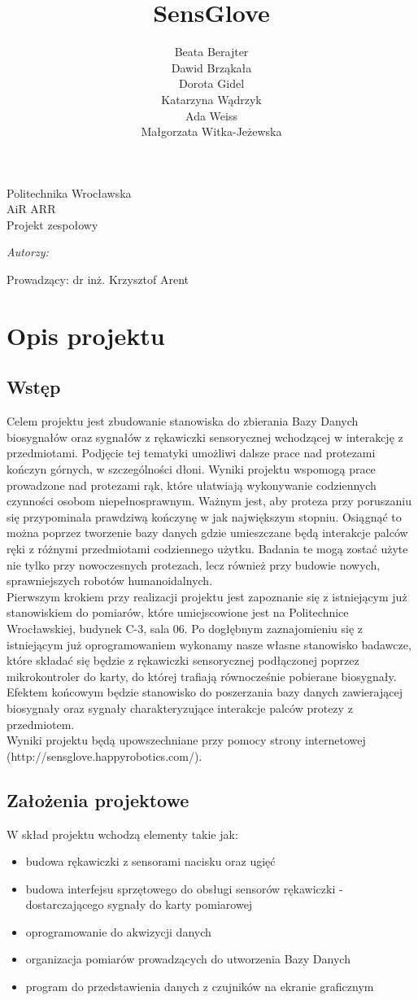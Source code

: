 \documentclass{article}
\author{Beata Berajter\\
Dawid Brząkała\\
Dorota Gidel\\
Katarzyna Wądrzyk\\
Ada Weiss\\
Małgorzata Witka-Jeżewska\\
 }%
\title{SensGlove}
\makeatletter
\renewcommand{\maketitle}{\begin{titlepage}
    \vspace*{1cm}
    \begin{center}
    Politechnika Wrocławska\\
    AiR ARR\\
 Projekt zespołowy
    \end{center}
      \vspace{3cm}
    \begin{center}

     \LARGE \textsc {\@title}
         \end{center}
     \vspace{1cm}

    \begin{center}
    \textit{ Autorzy:}\\
   \textit{\@author}
     \end{center}
      \vspace{1cm}

     \begin{center}

    Prowadzący:
  dr inż. Krzysztof Arent %
    \end{center}

    \vspace*{\stretch{6}}
    \begin{center}
    \@date
    \end{center}
  \end{titlepage}
}
\makeatother
\begin{document}
\maketitle
\newpage
\tableofcontents
\newpage
\section{Opis projektu}
\subsection{Wstęp}
Celem projektu jest zbudowanie stanowiska do zbierania Bazy Danych biosygnałów oraz sygnałów z rękawiczki sensorycznej wchodzącej w interakcję z przedmiotami. Podjęcie tej tematyki umożliwi dalsze prace nad protezami kończyn górnych, w szczególności dłoni. Wyniki projektu wspomogą prace prowadzone nad protezami rąk, które ułatwiają wykonywanie codziennych czynności osobom niepełnosprawnym. Ważnym jest, aby proteza przy poruszaniu się przypominała prawdziwą kończynę w jak największym stopniu. Osiągnąć to można poprzez tworzenie bazy danych gdzie umieszczane będą interakcje palców ręki z różnymi przedmiotami codziennego użytku.
Badania te mogą zostać użyte nie tylko przy nowoczesnych protezach, lecz również przy budowie nowych, sprawniejszych robotów humanoidalnych.\\
Pierwszym krokiem przy realizacji projektu jest zapoznanie się z istniejącym już stanowiskiem do pomiarów, które umiejscowione jest na Politechnice Wrocławskiej, budynek C-3, sala 06. Po dogłębnym zaznajomieniu się z istniejącym już oprogramowaniem wykonamy nasze własne stanowisko badawcze, które składać się będzie z rękawiczki sensorycznej podłączonej poprzez mikrokontroler do karty, do której trafiają równocześnie pobierane biosygnały.\\
Efektem końcowym będzie stanowisko do poszerzania bazy danych zawierającej biosygnały oraz sygnały charakteryzujące interakcje palców protezy z przedmiotem.\\
Wyniki projektu będą upowszechniane przy pomocy strony internetowej (http://sensglove.happyrobotics.com/).\\


\subsection{Założenia projektowe}
W skład projektu wchodzą elementy takie jak:
\begin{itemize}
\item budowa rękawiczki z sensorami nacisku oraz ugięć
\item budowa interfejsu sprzętowego do obsługi sensorów rękawiczki - dostarczającego sygnały do karty pomiarowej
\item oprogramowanie do akwizycji danych
\item organizacja pomiarów prowadzących do utworzenia Bazy Danych
\item program do przedstawienia danych z czujników na ekranie graficznym
\end{itemize}
\end{document}
